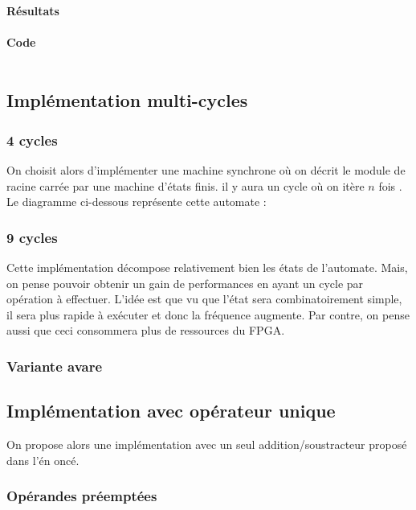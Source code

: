 \documentclass[12pt,a4paper]{article}
\newcommand{\inputvhdl}[1]{\inputminted[linenos,tabsize=2]{vhdl}{./src/#1.vhd}}
\begin{document}
\paragraph{Résultats}
\paragraph{Code}
\inputvhdl{SQRT_one_process}

\subsection{Implémentation multi-cycles}
\subsubsection{4 cycles}
On choisit alors d'implémenter une machine synchrone où on décrit le module de racine carrée par une machine d'états finis. il y aura un cycle où on itère $n$ fois . Le diagramme ci-dessous représente cette automate :
\begin{figure}[H]
\centering

\end{figure}

\subsubsection{9 cycles}
Cette implémentation décompose relativement bien les états de l'automate. Mais, on pense pouvoir obtenir un gain de performances en ayant un cycle par opération à effectuer. L'idée est que vu que l'état sera combinatoirement simple, il sera plus rapide  à exécuter et donc la fréquence augmente. Par contre, on pense aussi que ceci consommera plus de ressources du FPGA.
\begin{figure}[H]
	\centering
	
\end{figure}
\subsubsection{Variante avare} %

%

\subsection{Implémentation avec opérateur unique}
On propose alors une implémentation avec un seul addition/soustracteur proposé dans l'én oncé.
\subsubsection{Opérandes préemptées}
\end{document}
